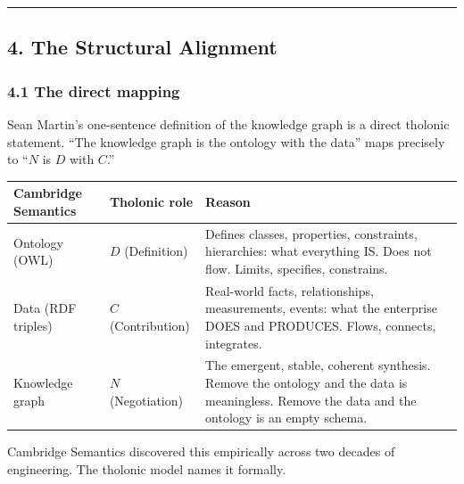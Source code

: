 \documentclass[
  11pt,
  letterpaper,
]{article}
\begin{document}
\begin{center}\rule{0.5\linewidth}{0.5pt}\end{center}

\subsection{4. The Structural Alignment}\label{the-structural-alignment}

\subsubsection{4.1 The direct mapping}\label{the-direct-mapping}

Sean Martin's one-sentence definition of the knowledge graph is a direct
tholonic statement. ``The knowledge graph is the ontology with the
data'' maps precisely to ``\(N\) is \(D\) with \(C\).''

\begin{longtable}[]{@{}
  >{\raggedright\arraybackslash}p{}
  >{\raggedright\arraybackslash}p{}
  >{\raggedright\arraybackslash}p{}@{}}
\toprule\noalign{}
\begin{minipage}[b]{\linewidth}\raggedright
Cambridge Semantics
\end{minipage} & \begin{minipage}[b]{\linewidth}\raggedright
Tholonic role
\end{minipage} & \begin{minipage}[b]{\linewidth}\raggedright
Reason
\end{minipage} \\
\midrule\noalign{}
\endhead
\bottomrule\noalign{}
\endlastfoot
Ontology (OWL) & \(D\) (Definition) & Defines classes, properties,
constraints, hierarchies: what everything IS. Does not flow. Limits,
specifies, constrains. \\
Data (RDF triples) & \(C\) (Contribution) & Real-world facts,
relationships, measurements, events: what the enterprise DOES and
PRODUCES. Flows, connects, integrates. \\
Knowledge graph & \(N\) (Negotiation) & The emergent, stable, coherent
synthesis. Remove the ontology and the data is meaningless. Remove the
data and the ontology is an empty schema. \\
\end{longtable}

Cambridge Semantics discovered this empirically across two decades of
engineering. The tholonic model names it formally.
\end{document}
